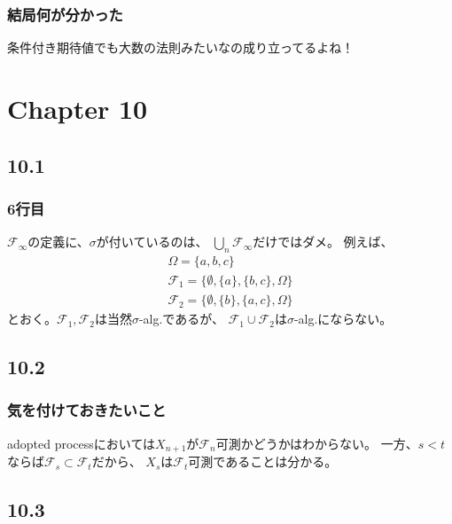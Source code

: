       \subsubsection{結局何が分かった}
        条件付き期待値でも大数の法則みたいなの成り立ってるよね！

  \section{Chapter 10}
    \subsection{10.1}
      \subsubsection{6行目}
        $\mathcal{F}_{\infty}$の定義に、$\sigma$が付いているのは、
        $\bigcup_n \mathcal{F}_{\infty}$だけではダメ。
        例えば、
      \begin{gather*}
        \Omega = \{a,b,c\}\\
        \mathcal{F}_1 = \{\emptyset, \{a\}, \{b, c\}, \Omega\}\\
        \mathcal{F}_2 = \{\emptyset, \{b\}, \{a, c\}, \Omega\}
      \end{gather*}
      とおく。$\mathcal{F}_1, \mathcal{F}_2$は当然$\sigma$-alg.であるが、
      $\mathcal{F}_1 \cup \mathcal{F}_2$は$\sigma$-alg.にならない。

    \subsection{10.2}
      \subsubsection{気を付けておきたいこと}
        adopted processにおいては$X_{n+1}$が$\mathcal{F}_n$可測かどうかはわからない。
        一方、$s < t$ならば$\mathcal{F}_s \subset \mathcal{F}_t$だから、
        $X_s$は$\mathcal{F}_t$可測であることは分かる。

    \subsection{10.3}
